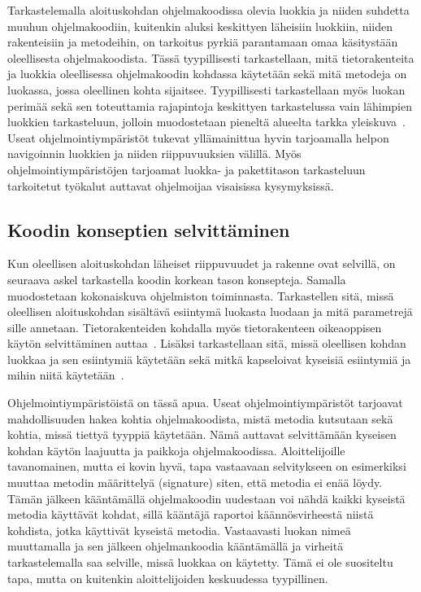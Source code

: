 \documentclass[finnish]{tktltiki2}
\theoremstyle{definition}
\theoremstyle{remark}
\begin{document}
Tarkastelemalla aloituskohdan ohjelmakoodissa olevia luokkia ja niiden suhdetta muuhun ohjelmakoodiin, kuitenkin aluksi keskittyen läheisiin luokkiin, niiden rakenteisiin ja metodeihin, on tarkoitus pyrkiä parantamaan omaa käsitystään oleellisesta ohjelmakoodista. Tässä tyypillisesti tarkastellaan, mitä tietorakenteita ja luokkia oleellisessa ohjelmakoodin kohdassa käytetään sekä mitä metodeja on luokassa, jossa oleellinen kohta sijaitsee. Tyypillisesti tarkastellaan myös luokan perimää sekä sen toteuttamia rajapintoja keskittyen tarkastelussa vain lähimpien luokkien tarkasteluun, jolloin muodostetaan pieneltä alueelta tarkka yleiskuva~\cite{questions-during-software-evolution-tasks}.
Useat ohjelmointiympäristöt tukevat yllämainittua hyvin tarjoamalla helpon navigoinnin luokkien ja niiden riippuvuuksien välillä. Myös ohjelmointiympäristöjen tarjoamat luokka- ja pakettitason tarkasteluun tarkoitetut työkalut auttavat ohjelmoijaa visaisissa kysymyksissä.

\subsection{Koodin konseptien selvittäminen}
Kun oleellisen aloituskohdan läheiset riippuvuudet ja rakenne ovat selvillä, on seuraava askel tarkastella koodin korkean tason konsepteja. Samalla muodostetaan kokonaiskuva ohjelmiston toiminnasta. Tarkastellen sitä, missä oleellisen aloituskohdan sisältävä esiintymä luokasta luodaan ja mitä parametrejä sille annetaan. Tietorakenteiden kohdalla myös tietorakenteen oikeaoppisen käytön selvittäminen auttaa~\cite{eliciting-design-requirements-for-maintenance-oriented-ides}. Lisäksi tarkastellaan sitä, missä oleellisen kohdan luokkaa ja sen esiintymiä käytetään sekä mitkä kapseloivat kyseisiä esiintymiä ja mihin niitä käytetään~\cite{questions-during-software-evolution-tasks}.

Ohjelmointiympäristöistä on tässä apua. Useat ohjelmointiympäristöt tarjoavat mahdollisuuden hakea kohtia ohjelmakoodista, mistä metodia kutsutaan sekä kohtia, missä tiettyä tyyppiä käytetään. Nämä auttavat selvittämään kyseisen kohdan käytön laajuutta ja paikkoja ohjelmakoodissa. Aloittelijoille tavanomainen, mutta ei kovin hyvä, tapa vastaavaan selvitykseen on esimerkiksi muuttaa metodin määrittelyä (signature) siten, että metodia ei enää löydy. Tämän jälkeen kääntämällä ohjelmakoodin uudestaan voi nähdä kaikki kyseistä metodia käyttävät kohdat, sillä kääntäjä raportoi käännösvirheestä niistä kohdista, jotka käyttivät kyseistä metodia. Vastaavasti luokan nimeä muuttamalla ja sen jälkeen ohjelmankoodia kääntämällä ja virheitä tarkastelemalla saa selville, missä luokkaa on käytetty. Tämä ei ole suositeltu tapa, mutta on kuitenkin aloittelijoiden keskuudessa tyypillinen.
\end{document}
